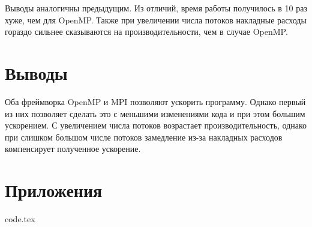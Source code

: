 \documentclass[./import.tex]{subfiles}
\begin{document}
Выводы аналогичны предыдущим. Из отличий, время работы получилось в 10 раз хуже, чем для OpenMP. Также при увеличении числа потоков накладные расходы гораздо сильнее сказываются на производительности, чем в случае OpenMP.

\section{Выводы}
Оба фреймворка OpenMP и MPI позволяют ускорить программу. Однако первый из них позволяет сделать это с меньшими изменениями кода и при этом большим ускорением. С увеличением числа потоков возрастает производительность, однако при слишком большом числе потоков замедление из-за накладных расходов компенсирует полученное ускорение.

\newpage
\section{Приложения}
{code.tex}
\end{document}
